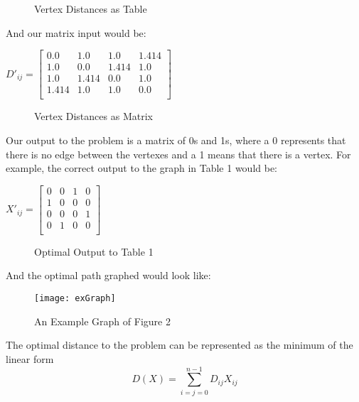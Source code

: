 \documentclass[a4paper,titlepage, margin, 11pt]{article}
\numberwithin{equation}{section}
\begin{document}
\begin{figure}[h!]
\caption{Vertex Distances as Table}
\end{figure}

\newpage
And our matrix input would be: \\


\begin{center}


$
D'_{ij} = 
\begin{bmatrix}
    0.0 & 1.0 & 1.0 & 1.414 \\
    1.0 & 0.0 & 1.414 & 1.0 \\
    1.0 & 1.414 & 0.0 & 1.0 \\
    1.414 & 1.0 & 1.0 & 0.0 \\
\end{bmatrix}
 $
 
 \begin{figure}[h!]
\caption{Vertex Distances as Matrix}
\end{figure}
\end{center}


Our output to the problem is a matrix of 0s and 1s, where a 0 represents that there is no edge between the vertexes and a 1 means that there is a vertex. For example, the correct output to the graph in Table 1 would be: 

\begin{center}
$
X'_{ij}=
\begin{bmatrix}
    0 & 0 & 1 & 0 \\
    1 & 0 & 0 & 0 \\
    0 & 0 & 0 & 1 \\
    0 & 1 & 0 & 0 \\
\end{bmatrix}
 $


 \begin{figure}[h!]
\caption{Optimal Output to Table 1}
\end{figure}
\end{center}

And the optimal path graphed would look like:

\begin{figure}[h!]
\centering
\texttt{[image: exGraph]}
\caption{An Example Graph of Figure 2}
\label{fig:exGraph}
\end{figure}


The optimal distance to the problem can be represented as the minimum of the linear form  
$$D(X) = \sum_{i=j=0}^{n-1} D_{ij}X_{ij}$$
\end{document}
